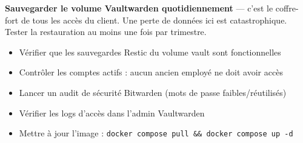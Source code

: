 \documentclass[11pt, a4paper]{article}
\begin{document}
\begin{attention}
  \textbf{Sauvegarder le volume Vaultwarden quotidiennement} — c'est le coffre-fort de tous les accès du client. Une perte de données ici est catastrophique. Tester la restauration au moins une fois par trimestre.
\end{attention}

\begin{checklist}
  \begin{itemize}
    \item[$\square$] Vérifier que les sauvegardes Restic du volume vault sont fonctionnelles
    \item[$\square$] Contrôler les comptes actifs : aucun ancien employé ne doit avoir accès
    \item[$\square$] Lancer un audit de sécurité Bitwarden (mots de passe faibles/réutilisés)
    \item[$\square$] Vérifier les logs d'accès dans l'admin Vaultwarden
    \item[$\square$] Mettre à jour l'image : \texttt{docker compose pull \&\& docker compose up -d}
  \end{itemize}
\end{checklist}
\end{document}
